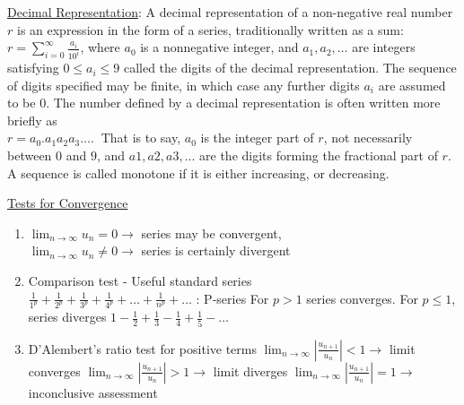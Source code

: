 \documentclass[12pt]{article}
\begin{document}
\begin{flushleft}
	\uline{Decimal Representation}: A decimal representation of a non-negative real number $r$ is an expression in the form of a series, traditionally written as a sum: $\displaystyle r = \sum \limits_{i=0}^{\infty} \frac{a_i}{10^i} $, where $a_0$ is a nonnegative integer, and $a_1, a_2, \ldots$ are integers satisfying $0\leq a_i \leq 9$ called the digits of the decimal representation. The sequence of digits specified may be finite, in which case any further digits $a_i$ are assumed to be 0. \linebreak 
	The number defined by a decimal representation is often written more briefly as \\
	$\displaystyle r=a_{0}.a_{1}a_{2}a_{3}\dots .\ $ \linebreak 
	That is to say, $a_0$ is the integer part of $r$, not necessarily between $0$ and $9$, and $a1, a2, a3, \ldots $ are the digits forming the fractional part of $r$. \linebreak 
	\textbullet \quad A sequence is called monotone if it is either increasing, or decreasing. \linebreak 
	
	\uline{Tests for Convergence}  
	\begin{enumerate}
	\item $\lim_{n\to\infty} u_n = 0 \rightarrow $ series may be convergent, \\ 
			$\lim_{n\to\infty} u_n \neq 0 \rightarrow $ series is certainly divergent \linebreak 
			
	\item Comparison test - Useful standard series \\ 
		\textbullet \quad $\displaystyle \frac{1}{1^p} + \frac{1}{2^p} + \frac{1}{3^p} + \frac{1}{4^p} + \ldots + \frac{1}{n^p} + \ldots $  :  P-series \linebreak 
			For $p>1$ series converges. For $p\leq 1$, series diverges \linebreak 
		\textbullet \quad $1 - \frac{1}{2} + \frac{1}{3} - \frac{1}{4} + \frac{1}{5} - \ldots $ \linebreak 
		
	\item D'Alembert's ratio test for positive terms \linebreak 
		\textbullet \quad $\lim_{n\to\infty} \left| \frac{u_{n+1}}{u_n} \right| < 1 \longrightarrow $ limit converges \linebreak 
		\textbullet \quad $\lim_{n\to\infty} \left| \frac{u_{n+1}}{u_n} \right| > 1 \longrightarrow $ limit diverges \linebreak 
		\textbullet \quad $\lim_{n\to\infty} \left| \frac{u_{n+1}}{u_n} \right| = 1 \longrightarrow $ inconclusive assessment \linebreak 
		

\end{enumerate}
\end{flushleft}
\end{document}
